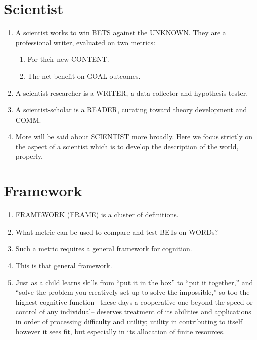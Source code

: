 \documentclass[
]{book}
\providecommand{\tightlist}{%
  \setlength{\itemsep}{0pt}\setlength{\parskip}{0pt}}
\begin{document}
\hypertarget{scientist}{%
\section{Scientist}\label{scientist}}

\begin{enumerate}
\def\labelenumi{\arabic{enumi}.}
\setcounter{enumi}{46}
\item
  A scientist works to win BETS against the UNKNOWN. They are a
  professional writer, evaluated on two metrics:

  \begin{enumerate}
  \def\labelenumii{\arabic{enumii}.}
  \tightlist
  \item
    For their new CONTENT.
  \item
    The net benefit on GOAL outcomes.
  \end{enumerate}
\item
  A scientist-researcher is a WRITER, a data-collector and hypothesis
  tester.
\item
  A scientist-scholar is a READER, curating toward theory development
  and COMM.
\item
  More will be said about SCIENTIST more broadly. Here we focus
  strictly on the aspect of a scientist which is to develop the
  description of the world, properly.
\end{enumerate}

\hypertarget{framework}{%
\section{Framework}\label{framework}}

\begin{enumerate}
\def\labelenumi{\arabic{enumi}.}
\setcounter{enumi}{50}
\item
  FRAMEWORK (FRAME) is a cluster of definitions.
\item
  What metric can be used to compare and test BETs on WORDs?
\item
  Such a metric requires a general framework for cognition.
\item
  This is that general framework.
\item
  Just as a child learns skills from ``put it in the box'' to ``put it
  together,'' and ``solve the problem you creatively set up to solve the
  impossible,'' so too the highest cognitive function --these days a
  cooperative one beyond the speed or control of any individual--
  deserves treatment of its abilities and applications in order of
  processing difficulty and utility; utility in contributing to itself
  however it sees fit, but especially in its allocation of finite
  resources.
\end{enumerate}
\end{document}
